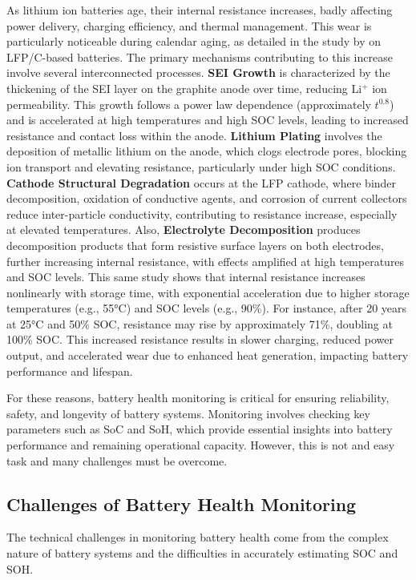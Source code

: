 As lithium ion batteries age, their internal resistance increases, badly affecting power delivery, charging efficiency, and thermal management. This wear is particularly noticeable during calendar aging, as detailed in the study by \cite{stroe_degradation_2018} on LFP/C-based batteries. The primary mechanisms contributing to this increase involve several interconnected processes. \textbf{SEI Growth} is characterized by the thickening of the SEI layer on the graphite anode over time, reducing Li$^+$ ion permeability. This growth follows a power law dependence (approximately $t^{0.8}$) and is accelerated at high temperatures and high SOC levels, leading to increased resistance and contact loss within the anode. \textbf{Lithium Plating} involves the deposition of metallic lithium on the anode, which clogs electrode pores, blocking ion transport and elevating resistance, particularly under high SOC conditions. \textbf{Cathode Structural Degradation} occurs at the LFP cathode, where binder decomposition, oxidation of conductive agents, and corrosion of current collectors reduce inter-particle conductivity, contributing to resistance increase, especially at elevated temperatures. Also, \textbf{Electrolyte Decomposition} produces decomposition products that form resistive surface layers on both electrodes, further increasing internal resistance, with effects amplified at high temperatures and SOC levels. This same study shows that internal resistance increases nonlinearly with storage time, with exponential acceleration due to higher storage temperatures (e.g., 55°C) and SOC levels (e.g., 90\%). For instance, after 20 years at 25°C and 50\% SOC, resistance may rise by approximately 71\%, doubling at 100\% SOC. This increased resistance results in slower charging, reduced power output, and accelerated wear due to enhanced heat generation, impacting battery performance and lifespan.

For these reasons, battery health monitoring is critical for ensuring reliability, safety, and longevity of battery systems. Monitoring involves checking key parameters such as SoC and SoH, which provide essential insights into battery performance and remaining operational capacity. However, this is not and easy task and many challenges must be overcome. 



\subsection{Challenges of Battery Health Monitoring}
The technical challenges in monitoring battery health come from the complex nature of battery systems and the difficulties in accurately estimating SOC and SOH.

